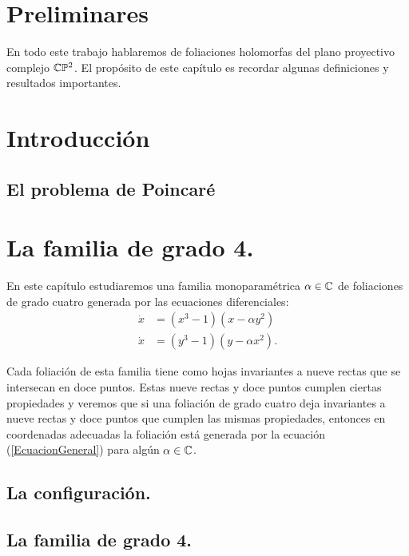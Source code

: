 \documentclass[10pt]{book}
\theoremstyle{definition}
\begin{document}
\tableofcontents
\chapter{Preliminares}

En todo este trabajo hablaremos de foliaciones holomorfas del plano proyectivo complejo $\mathbb{C}\mathbb{P}^2$. El propósito de este capítulo es recordar algunas definiciones y resultados importantes.

     

\chapter{Introducción}

  \section{El problema de Poincaré}

    

\chapter{La familia de grado 4.}
En este capítulo estudiaremos una familia monoparamétrica $\alpha\in\mathbb{C}$ de foliaciones de grado cuatro generada por las ecuaciones diferenciales:
\begin{equation}
\label{EcuacionGeneral}
\begin{aligned}
\dot{x} &= (x^{3}-1)(x-\alpha y^{2})\\
\dot{x} &= (y^{3}-1)(y-\alpha x^{2}).
\end{aligned}
\end{equation}

Cada foliación de esta familia tiene como hojas invariantes a nueve rectas que se intersecan en doce puntos. Estas nueve rectas y doce puntos cumplen ciertas propiedades y veremos que si una foliación de grado cuatro deja invariantes a nueve rectas y doce puntos que cumplen las mismas propiedades, entonces en coordenadas adecuadas la foliación está generada por la ecuación (\ref{EcuacionGeneral}) para algún $\alpha\in\mathbb{C}$.

 
	\section{La configuración.}

     	    

	\section{La familia de grado 4.}
\end{document}
